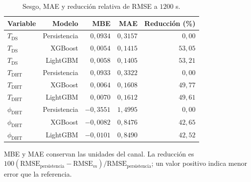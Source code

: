 \begin{table}[htbp]
\centering
\caption{Sesgo, MAE y reducción relativa de RMSE a $1200$ s.}
\label{tab:res_sesgo_mae}
\small
\setlength{\tabcolsep}{5pt}
\begin{tabular}{lrrrr}
\toprule
Variable & Modelo & MBE & MAE & Reducción (\%) \\
\midrule
$T_{\mathrm{DS}}$ & Persistencia & $0{,}0934$ & $0{,}3157$ & $0{,}00$ \\
$T_{\mathrm{DS}}$ & XGBoost & $0{,}0054$ & $0{,}1415$ & $53{,}05$ \\
$T_{\mathrm{DS}}$ & LightGBM & $0{,}0058$ & $0{,}1405$ & $53{,}21$ \\
$T_{\mathrm{DHT}}$ & Persistencia & $0{,}0933$ & $0{,}3322$ & $0{,}00$ \\
$T_{\mathrm{DHT}}$ & XGBoost & $0{,}0064$ & $0{,}1608$ & $49{,}77$ \\
$T_{\mathrm{DHT}}$ & LightGBM & $0{,}0070$ & $0{,}1612$ & $49{,}61$ \\
$\phi_{\mathrm{DHT}}$ & Persistencia & $-0{,}3551$ & $1{,}4995$ & $0{,}00$ \\
$\phi_{\mathrm{DHT}}$ & XGBoost & $-0{,}0082$ & $0{,}8476$ & $42{,}65$ \\
$\phi_{\mathrm{DHT}}$ & LightGBM & $-0{,}0101$ & $0{,}8490$ & $42{,}52$ \\
\bottomrule
\end{tabular}
\par\vspace{3pt}
\begin{minipage}{0.98\textwidth}\footnotesize
MBE y MAE conservan las unidades del canal. La reducción es $100(\mathrm{RMSE}_{\mathrm{persistencia}}-\mathrm{RMSE}_{m})/\mathrm{RMSE}_{\mathrm{persistencia}}$; un valor positivo indica menor error que la referencia.
\end{minipage}
\end{table}
